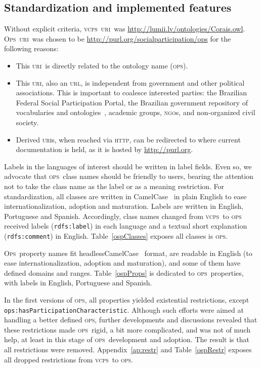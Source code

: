 \documentclass[10pt,letterpaper]{article}
\newcommand{\ops}{\textsc{ops}}
\newcommand{\opsi}{O\textsc{ps}}
\newcommand{\vcps}{\textsc{vcps}}
\newcommand{\uri}{\textsc{uri}}
\newcommand{\urll}{\textsc{url}}
\newcommand{\ngo}{\textsc{ngo}}
\newcommand{\http}{\textsc{http}}
\begin{document}
\subsection{Standardization and implemented features}\label{impl}
Without explicit criteria,
\vcps\ \uri\ was \url{http://lumii.lv/ontologies/Corais.owl}.
\opsi\ \uri\ was chosen to be \url{http://purl.org/socialparticipation/ops} for the following reasons:
\begin{itemize}
    \item This \uri\ is directly related to the ontology name (\ops).
    \item This \uri, also an \urll, is independent from government and other political associations.
    This is important to coalesce interested parties: the Brazilian Federal Social Participation Portal\cite{participa},
    the Brazilian government repository of vocabularies and ontologies~\cite{vocab},
    academic groups,  \ngo s, and non-organized civil society.
    \item Derived \uri s, when reached via \http, can be redirected to where current documentation is held,
    as it is hosted by \url{http://purl.org}.
\end{itemize}
Labels in the languages of interest should be written in label fields.
Even so, we advocate that \ops\ class names should be friendly to users,
bearing the attention not to take the class name as the label or as a meaning restriction.
For standardization, all classes are written in CamelCase~\cite{cc} in plain English to ease internationalization,
adoption and maturation.
Labels are written in English, Portuguese and Spanish.
Accordingly, class names changed from \vcps\ to \ops\,
received labels (\texttt{rdfs:label}) in each language
and a textual short explanation (\texttt{rdfs:comment}) in English. 
Table~\ref{ospClasses} exposes all classes is \ops.

\opsi\ property names fit headlessCamelCase~\cite{cc} format,
are readable in English (to ease internationalization, adoption and maturation),
and some of them have defined domains and ranges.
Table~\ref{ospProps} is dedicated to \ops\ properties, with labels in English, Portuguese and Spanish.

In the first versions of \ops, all properties yielded existential restrictions,
except {\tt ops:hasParticipationCharacteristic}.
Although such efforts were aimed at handling a better defined \ops,
further developments and discussions revealed that these restrictions made \ops\ rigid,
a bit more complicated, and was not of much help,
at least in this stage of \ops\ development and adoption.
The result is that all restrictions were removed.
Appendix~\ref{ap:restr} and Table~\ref{ospRestr} exposes all dropped restrictions from \vcps\ to \ops.
\end{document}
